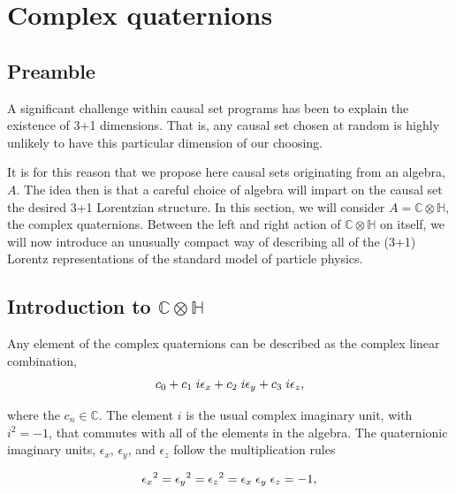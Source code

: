 \documentclass[letterpaper,12pt,titlepage,oneside,final]{book}
\newcommand{\CH}{\mathbb{C}\otimes\mathbb{H}}
\begin{document}
\chapter{Complex quaternions\label{CH}}

\section{Preamble}



A significant challenge within  causal set programs has been to explain the existence of 3+1 dimensions.
That is, any causal set chosen at random is highly unlikely to have this particular dimension of our choosing.  

It is for this reason that we propose here causal sets originating from an algebra, $A$.  The idea then is that a careful choice of algebra will impart on the causal set the desired 3+1 Lorentzian structure.  In this section, we will consider $A = \CH,$ the complex quaternions.  Between the left and right action of $\CH$ on itself, we will now introduce an unusually compact way of describing all of the (3+1) Lorentz representations of the standard model of particle physics.

\section{Introduction to $\CH$\label{introCH}  }


Any element of the complex quaternions can be described as the complex linear combination, 
\begin{equation}
c_0 + c_1 \hspace{1mm}i\epsilon_x + c_2 \hspace{1mm}i\epsilon_y+ c_3\hspace{1mm} i{\epsilon_z},
\end{equation}

\noindent where the $c_n \in \mathbb{C}$.  The element $i$ is the usual complex imaginary unit, with $i^2 = -1$, that commutes with all of the elements in the algebra.  The quaternionic imaginary units, ${\epsilon_x}$, ${\epsilon_y}$, and ${\epsilon_z}$ follow the multiplication rules 

\begin{equation}\label{CHmult}
{\epsilon_x}^2={\epsilon_y}^2={\epsilon_z}^2={\epsilon_x}\hspace{1mm}{\epsilon_y}\hspace{1mm}{\epsilon_z}=-1,
\end{equation}
\end{document}

